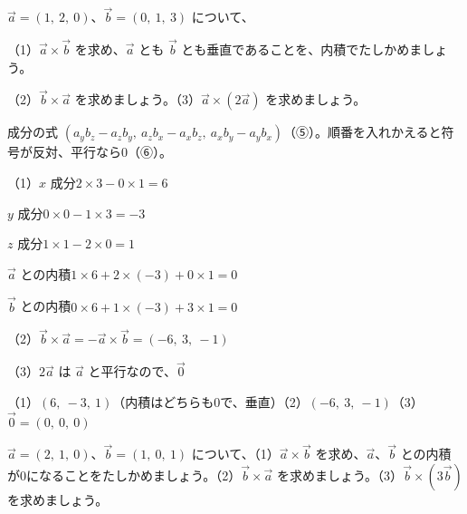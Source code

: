\begin{reidai}[外積を成分で計算する]
$\vec a=(1,\ 2,\ 0)$、$\vec b=(0,\ 1,\ 3)$ について、\par
（1）$\vec a\times\vec b$ を求め、$\vec a$ とも $\vec b$ とも垂直であることを、内積でたしかめましょう。\par
（2）$\vec b\times\vec a$ を求めましょう。\quad（3）$\vec a\times(2\vec a)$ を求めましょう。\par
\kangaekata 成分の式 $(a_yb_z-a_zb_y,\ a_zb_x-a_xb_z,\ a_xb_y-a_yb_x)$（⑤）。順番を入れかえると符号が反対、平行なら0（⑥）。\par
\shiki（1）$x$ 成分\enspace $2\times3-0\times1=6$\par
\hspace*{4.6\zw}$y$ 成分\enspace $0\times0-1\times3=-3$\par
\hspace*{4.6\zw}$z$ 成分\enspace $1\times1-2\times0=1$\par
\hspace*{4.6\zw}$\vec a$ との内積\enspace $1\times6+2\times(-3)+0\times1=0$\par
\hspace*{4.6\zw}$\vec b$ との内積\enspace $0\times6+1\times(-3)+3\times1=0$\par
\hspace*{2.6\zw}（2）$\vec b\times\vec a=-\vec a\times\vec b=(-6,\ 3,\ -1)$\par
\hspace*{2.6\zw}（3）$2\vec a$ は $\vec a$ と平行なので、$\vec 0$\par
\kotae （1）$(6,\ -3,\ 1)$（内積はどちらも0で、垂直）\quad（2）$(-6,\ 3,\ -1)$\quad（3）$\vec 0=(0,\ 0,\ 0)$
\end{reidai}

\begin{jibun}
$\vec a=(2,\ 1,\ 0)$、$\vec b=(1,\ 0,\ 1)$ について、（1）$\vec a\times\vec b$ を求め、$\vec a$、$\vec b$ との内積が0になることをたしかめましょう。（2）$\vec b\times\vec a$ を求めましょう。（3）$\vec b\times(3\vec b)$ を求めましょう。
\end{jibun}


